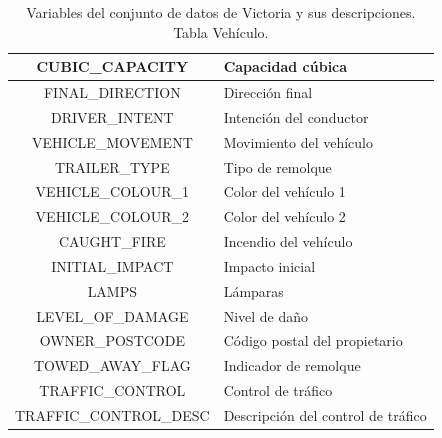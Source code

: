 \documentclass{uathesis-es}
\begin{document}
{\begin{table}[H]
\begin{center}
\begin{tabular}{|c|l|}
					CUBIC\_CAPACITY & Capacidad cúbica \\ \hline
					FINAL\_DIRECTION & Dirección final \\ \hline
					DRIVER\_INTENT & Intención del conductor \\ \hline
					VEHICLE\_MOVEMENT & Movimiento del vehículo \\ \hline
					TRAILER\_TYPE & Tipo de remolque \\ \hline
					VEHICLE\_COLOUR\_1 & Color del vehículo 1 \\ \hline
					VEHICLE\_COLOUR\_2 & Color del vehículo 2 \\ \hline
					CAUGHT\_FIRE & Incendio del vehículo \\ \hline
					INITIAL\_IMPACT & Impacto inicial \\ \hline
					LAMPS & Lámparas \\ \hline
					LEVEL\_OF\_DAMAGE & Nivel de daño \\ \hline
					OWNER\_POSTCODE & Código postal del propietario \\ \hline
					TOWED\_AWAY\_FLAG & Indicador de remolque \\ \hline
					TRAFFIC\_CONTROL & Control de tráfico \\ \hline
					TRAFFIC\_CONTROL\_DESC & Descripción del control de tráfico \\ \hline
				\end{tabular}
			\end{center}
			\caption{Variables del conjunto de datos de Victoria y sus descripciones. Tabla Vehículo.}
			\label{Victoria_VEHICLE_TABLE}
		\end{table} 
		
}
\end{document}
